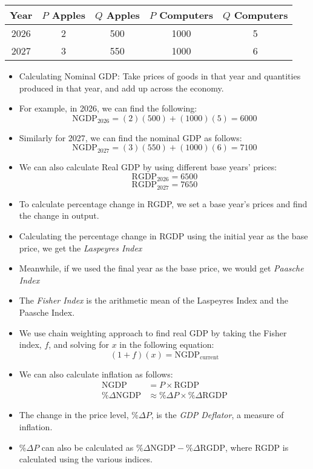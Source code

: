 \documentclass[8pt]{extarticle}
\title{}
\author{Avinash Iyer}
\date{}
\begin{document}
{
  \begin{center}
    \begin{tabular}{|c|c|c|c|c|}
      \hline
      Year & $P$ Apples & $Q$ Apples & $P$ Computers & $Q$ Computers\\
      \hline
      2026 & 2 & 500 & 1000 & 5 \\
      2027 & 3 & 550 & 1000 & 6\\
      \hline
    \end{tabular}
\end{center} 
\begin{itemize}
    \item Calculating Nominal GDP: Take prices of goods in that year and quantities produced in that year, and add up across the economy.
    \item For example, in 2026, we can find the following:
      \[\textrm{NGDP}_{2026} = (2)(500) + (1000)(5) = 6000\]
    \item Similarly for 2027, we can find the nominal GDP as follows:
      \[
        \textrm{NGDP}_{2027} = (3)(550) + (1000)(6) = 7100
      \]
    \item We can also calculate Real GDP by using different base years' prices:
      \[
      \textrm{RGDP}_{2026} = 6500
      \]
    \[
      \textrm{RGDP}_{2027} = 7650
    \]
    \item To calculate percentage change in RGDP, we set a base year's prices and find the change in output.
    \item Calculating the percentage change in RGDP using the initial year as the base price, we get the \textit{Laspeyres Index}
    \item Meanwhile, if we used the final year as the base price, we would get \textit{Paasche Index}
    \item The \textit{Fisher Index} is the arithmetic mean of the Laspeyres Index and the Paasche Index.
    \item We use chain weighting approach to find real GDP by taking the Fisher index, $f$, and solving for $x$ in the following equation:
      \[(1+f)(x) = \textrm{NGDP}_{\textrm{current}}\]
    \item We can also calculate inflation as follows:
        \begin{align*}
          \textrm{NGDP} &= P\times \textrm{RGDP} \\
          \%\Delta\textrm{NGDP} &\approx \%\Delta P \times \%\Delta\textrm{RGDP}
        \end{align*}
    \item The change in the price level, $\%\Delta P$, is the \textit{GDP Deflator}, a measure of inflation.
    \item $\%\Delta P$ can also be calculated as $\%\Delta \textrm{NGDP} - \%\Delta\textrm{RGDP}$, where RGDP is calculated using the various indices.
  \end{itemize}
}
\end{document}
